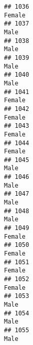 \documentclass[]{article}
\begin{document}
\begin{verbatim}
## 1036                                                                                                                          Female
## 1037                                                                                                                            Male
## 1038                                                                                                                            Male
## 1039                                                                                                                            Male
## 1040                                                                                                                            Male
## 1041                                                                                                                          Female
## 1042                                                                                                                          Female
## 1043                                                                                                                          Female
## 1044                                                                                                                          Female
## 1045                                                                                                                            Male
## 1046                                                                                                                            Male
## 1047                                                                                                                            Male
## 1048                                                                                                                            Male
## 1049                                                                                                                          Female
## 1050                                                                                                                          Female
## 1051                                                                                                                          Female
## 1052                                                                                                                          Female
## 1053                                                                                                                            Male
## 1054                                                                                                                            Male
## 1055                                                                                                                            Male

\end{verbatim}
\end{document}
